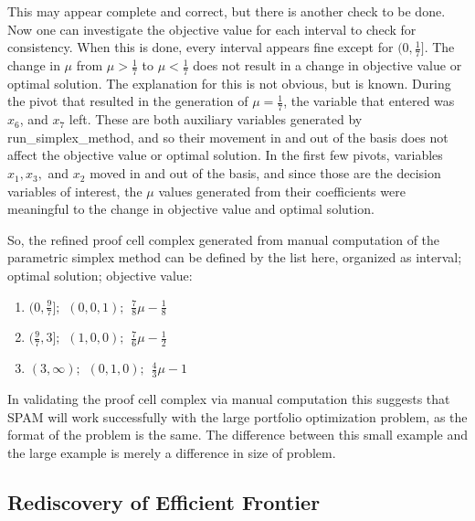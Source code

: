 \documentclass{article}
\begin{document}
This may appear complete and correct, but there is another check to be done. Now one can investigate the objective value for each interval to check for consistency. When this is done, every interval appears fine except for $(0, \frac{1}{7}]$. The change in $\mu$ from $\mu > \frac{1}{7}$ to $\mu < \frac{1}{7}$ does not result in a change in objective value or optimal solution. The explanation for this is not obvious, but is known. During the pivot that resulted in the generation of $\mu = \frac{1}{7}$, the variable that entered was $x_6$, and $x_7$ left. These are both auxiliary variables generated by {\selectfont run\_simplex\_method}, and so their movement in and out of the basis does not affect the objective value or optimal solution. In the first few pivots, variables $x_1, x_3,$ and $x_2$ moved in and out of the basis, and since those are the decision variables of interest, the $\mu$ values generated from their coefficients were meaningful to the change in objective value and optimal solution. 

So, the refined proof cell complex generated from manual computation of the parametric simplex method can be defined by the list here, organized as interval; optimal solution; objective value:

\begin{enumerate}
    \item $(0,\frac{9}{7}];\hspace{5pt} (0,0,1);\hspace{5pt} \frac{7}{8}\mu - \frac{1}{8}$
    \item $(\frac{9}{7}, 3];\hspace{5pt} (1,0,0);\hspace{5pt} \frac{7}{6}\mu - \frac{1}{2}$
    \item $(3,\infty);\hspace{5pt} (0,1,0);\hspace{5pt} \frac{4}{3}\mu - 1$
\end{enumerate}


In validating the proof cell complex via manual computation this suggests that SPAM will work successfully with the large portfolio optimization problem, as the format of the problem is the same. The difference between this small example and the large example is merely a difference in size of problem.

\subsection{Rediscovery of Efficient Frontier}
\end{document}
